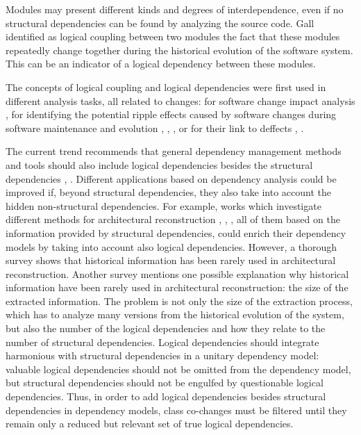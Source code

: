 \documentclass[a4paper,twoside]{article}
\begin{document}
Modules may present different kinds and degrees of interdependence, even if no structural dependencies can be found by analyzing the source code. Gall \cite{Gall:1998:DLC:850947.853338} identified as logical coupling between two modules the fact that these modules repeatedly change together during the historical evolution of the software system. This can be an indicator of a logical dependency between these modules.

The concepts of logical coupling and logical dependencies were first used in different analysis tasks, all related to changes: for software change impact analysis \cite{1553643}, for identifying the potential ripple effects caused by software changes during software maintenance and evolution \cite{DBLP:conf/issre/OlivaG15}, \cite{Oliva:2011:ISL:2067853.2068086}, \cite{Poshyvanyk2009}, \cite{posh2010} or for their link to deffects \cite{wiese}, \cite{Zimmermann:2004:MVH:998675.999460}.

The current trend recommends that general dependency management methods and tools should also include logical dependencies besides the structural dependencies \cite{Oliva:2011:ISL:2067853.2068086}, \cite{DBLP:journals/jss/AjienkaC17}. Different applications based on dependency analysis could be improved if, beyond structural dependencies, they also take into account the hidden non-structural dependencies. For example, works  which investigate different methods for architectural reconstruction \cite{SoraConti}, \cite{SoraSem13}, \cite{PagerankENASE},  all of them based on the information provided by structural dependencies, could enrich their dependency models by taking into account also logical dependencies. However, a thorough survey \cite{sar} shows that historical information has been rarely used in architectural reconstruction. Another survey \cite{Shtern:2012:CMS:2332427.2332428} mentions one possible explanation why historical information have been rarely used in architectural reconstruction: the size of the extracted information. The problem is not only the size of the extraction process, which has to analyze many versions from the historical evolution of the system, but also the number of the logical dependencies and how they relate to the number of structural dependencies. Logical dependencies should integrate harmonious with structural dependencies in a unitary dependency model: valuable logical dependencies should not be omitted from the dependency model, but structural dependencies should not be engulfed by questionable logical dependencies.  
Thus, in order to add logical dependencies besides structural dependencies in dependency models, class co-changes must be filtered until they remain only a reduced but relevant set of true logical dependencies. 
\end{document}
